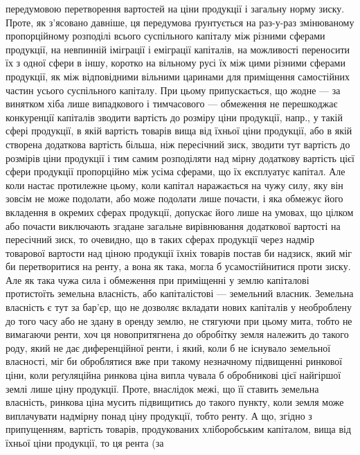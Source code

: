 \parcont{}  %
передумовою перетворення вартостей на ціни продукції і загальну норму зиску. Проте, як з’ясовано
давніше, ця передумова ґрунтується на раз-у-раз змінюваному пропорційному розподілі всього
суспільного капіталу між різними сферами продукції, на невпинній іміграції і еміграції капіталів, на
можливості переносити їх з одної сфери в іншу, коротко на вільному русі їх між цими різними сферами
продукції, як між відповідними вільними
царинами для приміщення самостійних частин усього суспільного капіталу. При цьому припускається, що
жодне — за винятком хіба лише випадкового і тимчасового — обмеження не перешкоджає конкуренції
капіталів зводити вартість до розміру ціни продукції, напр., у такій сфері продукції, в якій
вартість товарів вища від їхньої ціни продукції, або в якій створена додаткова вартість більша, ніж
пересічний зиск, зводити тут вартість до розмірів ціни продукції і тим самим розподіляти над мірну
додаткову вартість цієї сфери продукції пропорційно між усіма сферами,
що їх експлуатує капітал. Але коли настає протилежне цьому, коли капітал
наражається на чужу силу, яку він зовсім не може подолати, або може подолати
лише почасти, і яка обмежує його вкладення в окремих сферах продукції,
допускає його лише на умовах, що цілком або почасти виключають
згадане загальне вирівнювання додаткової вартості на пересічний зиск, то очевидно, що в таких сферах
продукції через надмір товарової вартости над ціною продукції їхніх товарів постав би надзиск, який
міг би перетворитися на ренту, а вона як така, могла б усамостійнитися проти зиску. Але як така чужа
сила і обмеження при приміщенні у землю капіталові протистоїть земельна власність, або капіталістові
— земельний власник.
       Земельна власність є тут за бар’єр, що не дозволяє вкладати нових капіталів
у необроблену до того часу або не здану в оренду землю, не стягуючи
при цьому мита, тобто не вимагаючи ренти, хоч ця новопритягнена до обробітку
земля належить до такого роду, який не дає диференційної ренти, і який, коли б не існувало земельної
власності, міг би оброблятися вже при такому незначному підвищенні ринкової ціни, коли реґуляційна
ринкова ціна випла чувала б обробникові цієї найгіршої землі лише ціну продукції. Проте, внаслідок
межі, що її ставить земельна власність, ринкова ціна мусить підвищитись до такого пункту, коли земля
може виплачувати надмірну понад ціну продукції, тобто ренту. А що, згідно з припущенням, вартість
товарів, продукованих хліборобським капіталом, вища від їхньої ціни продукції, то ця рента (за
